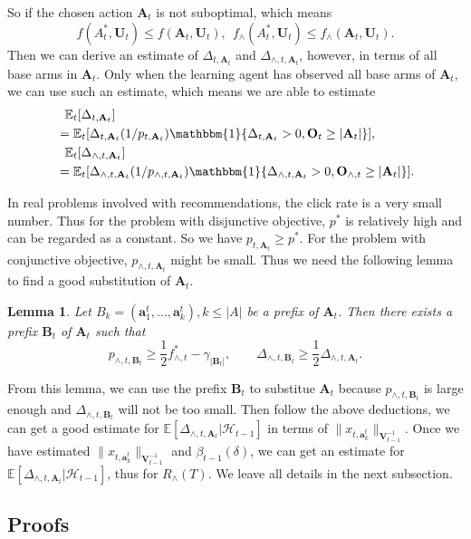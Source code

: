 \documentclass{article}
\newcommand{\EE}{\mathbb{E}}
\newcommand{\bOne}{\mathbbm{1}}
\newcommand{\bA}{\mathbf{A}}
\newcommand{\ba}{\mathbf{a}}
\newcommand{\bB}{\mathbf{B}}
\newcommand{\bO}{\mathbf{O}}
\newcommand{\bU}{\mathbf{U}}
\newcommand{\bV}{\mathbf{V}}
\newcommand{\cH}{\mathcal{H}}
\newcommand{\abs}[1]{\left| #1 \right|}
\newcommand{\norm}[1]{\| #1 \|}
\newtheorem{lemma}[theorem]{Lemma}%
\begin{document}
So if the chosen action $\bA_t$ is not suboptimal, which means
$$
f(A_t^*, \bU_t) \leq f(\bA_t, \bU_t), ~~ f_{\wedge}(A_t^*, \bU_t) \leq f_{\wedge}(\bA_t, \bU_t).
$$
Then we can derive an estimate of $\Delta_{t, \bA_t}$ and $\Delta_{\wedge, t, \bA_t}$, however, in terms of all base arms in $\bA_t$. Only when the learning agent has observed all base arms of $\bA_t$, we can use such an estimate, which means we are able to estimate
\begin{align*}
&~~\EE_t[\Delta_{t, \bA_t}] \\
&= \EE_t[\Delta_{t, \bA_t}(1/p_{t, \bA_t}) \bOne\{\Delta_{t, \bA_t} > 0, \bO_t \geq \abs{\bA_t}\}],\\
&~~\EE_t[\Delta_{\wedge, t, \bA_t}] \\
&= \EE_t[\Delta_{\wedge, t, \bA_t}(1/p_{\wedge, t, \bA_t}) \bOne\{\Delta_{\wedge, t, \bA_t} > 0, \bO_{\wedge, t} \geq \abs{\bA_t}\}].
\end{align*}

In real problems involved with recommendations, the click rate is a very small number. Thus for the problem with disjunctive objective, $p^*$ is relatively high and can be regarded as a constant. So we have $p_{t, \bA_t} \geq p^*$. For the problem with conjunctive objective, $p_{\wedge, t, \bA_t}$ might be small. Thus we need the following lemma to find a good substitution of $\bA_t$.

\begin{lemma}
\label{lem:prefixExist}
Let $B_k = (\ba_1^t, \ldots, \ba_k^t), k \leq \abs{A}$ be a prefix of $\bA_t$. Then there exists a prefix $\bB_t$ of $\bA_t$ such that
$$
p_{\wedge, t, \bB_t} \geq \frac{1}{2} f_{\wedge, t}^* - \gamma_{\abs{\bB_t}}, \qquad \Delta_{\wedge, t, \bB_t} \geq \frac{1}{2} \Delta_{\wedge, t, \bA_t}.
$$
\end{lemma}
From this lemma, we can use the prefix $\bB_t$ to substitue $\bA_t$ because $p_{\wedge, t, \bB_t}$ is large enough and $\Delta_{\wedge, t, \bB_t}$ will not be too small. Then follow the above deductions, we can get a good estimate for $\EE[\Delta_{\wedge, t, \bA_t}|\cH_{t-1}]$ in terms of $\norm{x_{t,\ba_k^t}}_{\bV_{t-1}^{-1}}$. Once we have estimated $\norm{x_{t,\ba_k^t}}_{\bV_{t-1}^{-1}}$ and $\beta_{t-1}(\delta)$, we can get an estimate for $\EE[\Delta_{\wedge, t, \bA_t}|\cH_{t-1}]$, thus for $R_{\wedge}(T)$. We leave all details in the next subsection.


\subsection{Proofs}
\end{document}
